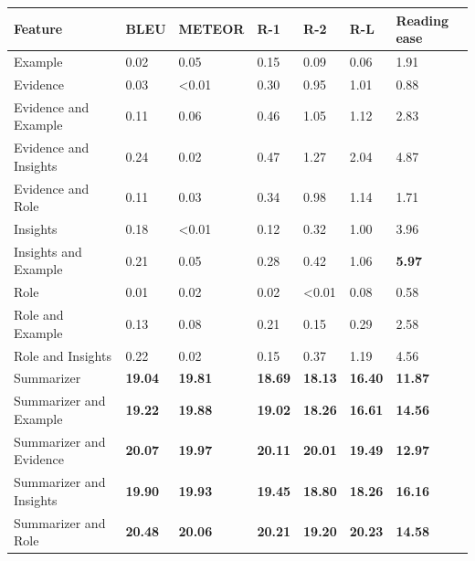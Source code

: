 \begin{tabular}{|l|l|l|l|l|l|l|}
\hline
\textbf{Feature} & BLEU & METEOR & R-1 & R-2 & R-L & Reading ease \\
 \hline
 Example & 0.02 & 0.05 & 0.15 & 0.09 & 0.06 & 1.91 \\
 \hline
 Evidence & 0.03 & \textless{}0.01 & 0.30 & 0.95 & 1.01 & 0.88 \\
 \hline
 Evidence and Example & 0.11 & 0.06 & 0.46 & 1.05 & 1.12 & 2.83 \\
 \hline
 Evidence and Insights & 0.24 & 0.02 & 0.47 & 1.27 & 2.04 & 4.87 \\
 \hline
 Evidence and Role & 0.11 & 0.03 & 0.34 & 0.98 & 1.14 & 1.71 \\
 \hline
 Insights & 0.18 & \textless{}0.01 & 0.12 & 0.32 & 1.00 & 3.96 \\
 \hline
 Insights and Example & 0.21 & 0.05 & 0.28 & 0.42 & 1.06 & \textbf{5.97} \\
 \hline
 Role & 0.01 & 0.02 & 0.02 & \textless{}0.01 & 0.08 & 0.58 \\
 \hline
 Role and Example & 0.13 & 0.08 & 0.21 & 0.15 & 0.29 & 2.58 \\
 \hline
 Role and Insights & 0.22 & 0.02 & 0.15 & 0.37 & 1.19 & 4.56 \\
 \hline
 Summarizer & \textbf{19.04} & \textbf{19.81} & \textbf{18.69} & \textbf{18.13} & \textbf{16.40} & \textbf{11.87} \\
 \hline
 Summarizer and Example & \textbf{19.22} & \textbf{19.88} & \textbf{19.02} & \textbf{18.26} & \textbf{16.61} & \textbf{14.56} \\
 \hline
 Summarizer and Evidence & \textbf{20.07} & \textbf{19.97} & \textbf{20.11} & \textbf{20.01} & \textbf{19.49} & \textbf{12.97} \\
 \hline
 Summarizer and Insights & \textbf{19.90} & \textbf{19.93} & \textbf{19.45} & \textbf{18.80} & \textbf{18.26} & \textbf{16.16} \\
 \hline
 Summarizer and Role & \textbf{20.48} & \textbf{20.06} & \textbf{20.21} & \textbf{19.20} & \textbf{20.23} & \textbf{14.58} \\
\hline
\end{tabular}
